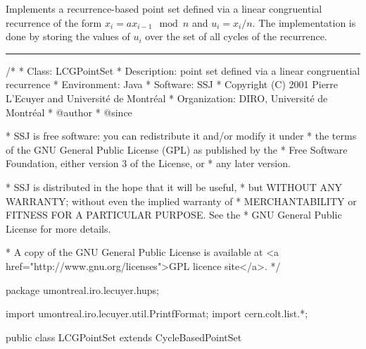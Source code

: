 
Implements a recurrence-based point set defined via a linear 
congruential recurrence of the form $x_i = a x_{i-1} \mod n$
and $u_i = x_i / n$.  The implementation is done by storing the values
of $u_i$ over the set of all cycles of the recurrence.
 

\bigskip\hrule\bigskip

\begin{code}
\begin{hide}
/*
 * Class:        LCGPointSet
 * Description:  point set defined via a linear congruential recurrence
 * Environment:  Java
 * Software:     SSJ 
 * Copyright (C) 2001  Pierre L'Ecuyer and Université de Montréal
 * Organization: DIRO, Université de Montréal
 * @author       
 * @since

 * SSJ is free software: you can redistribute it and/or modify it under
 * the terms of the GNU General Public License (GPL) as published by the
 * Free Software Foundation, either version 3 of the License, or
 * any later version.

 * SSJ is distributed in the hope that it will be useful,
 * but WITHOUT ANY WARRANTY; without even the implied warranty of
 * MERCHANTABILITY or FITNESS FOR A PARTICULAR PURPOSE.  See the
 * GNU General Public License for more details.

 * A copy of the GNU General Public License is available at
   <a href="http://www.gnu.org/licenses">GPL licence site</a>.
 */
\end{hide}
package umontreal.iro.lecuyer.hups;\begin{hide}
import umontreal.iro.lecuyer.util.PrintfFormat;
import cern.colt.list.*;
\end{hide}

public class LCGPointSet extends CycleBasedPointSet \begin{hide} {

      private int a;                      // Multiplier.

\end{hide}
\end{code}

